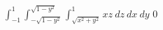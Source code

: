 {$\int_{-1}^{1} \int_{-\sqrt{1-y^2}}^{\sqrt{1-y^2}} \int_{\sqrt{x^2 + y^2}}^{1} xz \: dz \: dx \: dy$ 
}
{$0$}
